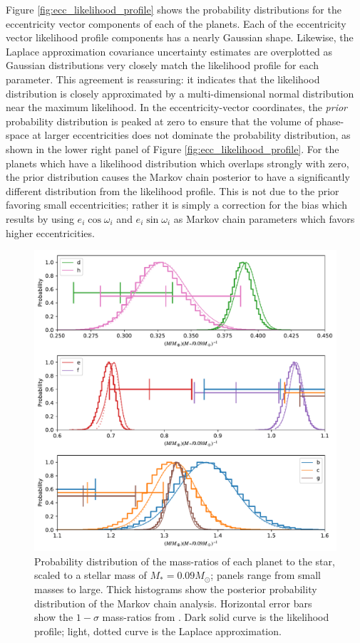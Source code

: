 \documentclass[twocolumn]{aastex63}
\begin{document}
Figure \ref{fig:ecc_likelihood_profile} shows the probability distributions
for the eccentricity vector components of each of the planets.
Each of the eccentricity vector likelihood profile components 
has a nearly Gaussian
shape.  Likewise, the Laplace approximation covariance uncertainty estimates are overplotted as
Gaussian distributions very closely match the likelihood profile
for each parameter.  This agreement is reassuring:  it indicates
that the likelihood distribution is closely approximated by
a multi-dimensional normal distribution near the maximum likelihood.   
In the eccentricity-vector coordinates,
the {\it prior} probability distribution is peaked
at zero to ensure that the volume of phase-space at larger
eccentricities does not dominate the probability distribution,
as shown in the lower right panel of Figure \ref{fig:ecc_likelihood_profile}.  
For the planets which have
a likelihood distribution which overlaps strongly with zero,
the prior distribution causes the Markov chain posterior to
have a significantly different distribution from the likelihood profile.  This is not
due to the prior favoring small eccentricities;  rather it is simply
a correction for the bias which results by using $e_i\cos{\omega_i}$
and $e_i\sin{\omega_i}$ as Markov chain parameters which favors
higher eccentricities. 

\begin{figure}
    \centering
    \includegraphics[width=\hsize]{figures/T1_masses_03312020.pdf}
    \caption{Probability distribution of the mass-ratios of each planet to the star, scaled to a stellar mass of $M_*  = 0.09 M_\odot$; panels range from small masses to large.   Thick
    histograms show the posterior probability distribution of the Markov chain analysis.
    Horizontal error bars show the $1-\sigma$ mass-ratios from \citet{Grimm2018}.
    Dark solid curve is the likelihood profile; light, dotted curve is the Laplace approximation.}
    \label{fig:mass_likelihood_profile}
\end{figure}
\end{document}
